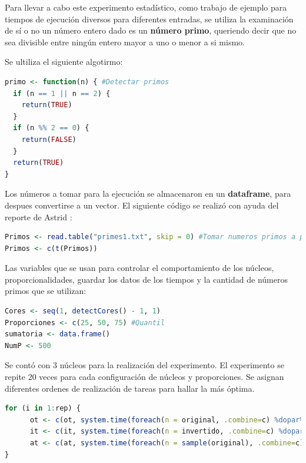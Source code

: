 \documentclass{article}
\begin{document}
Para llevar a cabo este experimento estad\'istico, como trabajo de ejemplo para tiempos de ejecuci\'on diversos para diferentes entradas, se utiliza la examinaci\'on de s\'i o no un n\'umero entero dado es un \textbf{n\'umero primo}, queriendo decir que no sea divisible entre ning\'un entero mayor a uno o menor a si mismo.

\newpage

Se ultiliza el siguiente algotirmo:

\begin{lstlisting}[language=R]
primo <- function(n) { #Detectar primos
  if (n == 1 || n == 2) {
    return(TRUE)
  }
  if (n %% 2 == 0) {
    return(FALSE)
  }
  return(TRUE)
}
\end{lstlisting}

Los n\'umeros a tomar para la ejecuci\'on se almacenaron en un \textbf{dataframe}, para despues convertirse a un vector. El siguiente c\'odigo se realiz\'o con ayuda del reporte de Astrid \cite{Astrid3}:

\begin{lstlisting}[language=R]
Primos <- read.table("primes1.txt", skip = 0) #Tomar numeros primos a partir de 6 digitos
Primos <- c(t(Primos))
\end{lstlisting}

Las variables que se usan para controlar el comportamiento de los n\'ucleos, proporcionalidades, guardar los datos de los tiempos y la cantidad de n\'umeros primos que se utilizan:

\begin{lstlisting}[language=R]
Cores <- seq(1, detectCores() - 1, 1)
Proporciones <- c(25, 50, 75) #Quantil
sumatoria <- data.frame()
NumP <- 500
\end{lstlisting}

Se cont\'o con 3 n\'ucleos para la realizaci\'on del experimento. El experimento se repite 20 veces para cada configuraci\'on de n\'ucleos y proporciones. Se asignan diferentes ordenes de realizaci\'on de tareas para hallar la m\'as \'optima.

\begin{lstlisting}[language=R]
for (i in 1:rep) {
      ot <- c(ot, system.time(foreach(n = original, .combine=c) %dopar% primo(n))[3]) # de menor a mayor
      it <- c(it, system.time(foreach(n = invertido, .combine=c) %dopar% primo(n))[3]) # de mayor a menor
      at <- c(at, system.time(foreach(n = sample(original), .combine=c) %dopar% primo(n))[3]) # orden aleatorio
}
\end{lstlisting}
\end{document}
